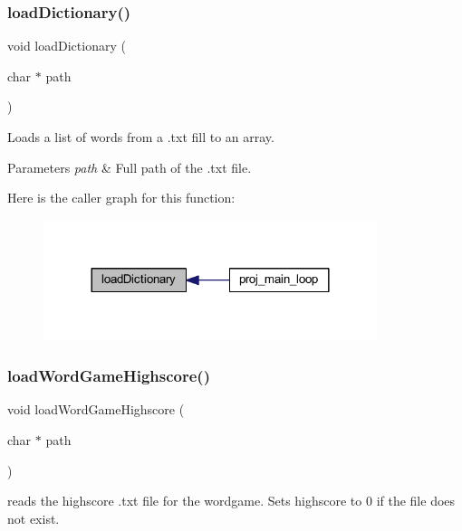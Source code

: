\subsubsection{\texorpdfstring{load\+Dictionary()}{loadDictionary()}}
{\footnotesize\ttfamily void load\+Dictionary (\begin{DoxyParamCaption}\item[{char $\ast$}]{path }\end{DoxyParamCaption})}



Loads a list of words from a .txt fill to an array. 


\begin{DoxyParams}{Parameters}
{\em path} & Full path of the .txt file. \\
\hline
\end{DoxyParams}
Here is the caller graph for this function\+:\nopagebreak
\begin{figure}[H]
\begin{center}
\leavevmode
\includegraphics[width=276pt]{group__wordpicker_ga7ae040ad09e5ee83b7d121c4290d79b6_icgraph}
\end{center}
\end{figure}
\mbox{\label{group__wordpicker_gab63191abcd00066c036c0b26e148651a}} 
\subsubsection{\texorpdfstring{load\+Word\+Game\+Highscore()}{loadWordGameHighscore()}}
{\footnotesize\ttfamily void load\+Word\+Game\+Highscore (\begin{DoxyParamCaption}\item[{char $\ast$}]{path }\end{DoxyParamCaption})}



reads the highscore .txt file for the wordgame. Sets highscore to 0 if the file does not exist. 


